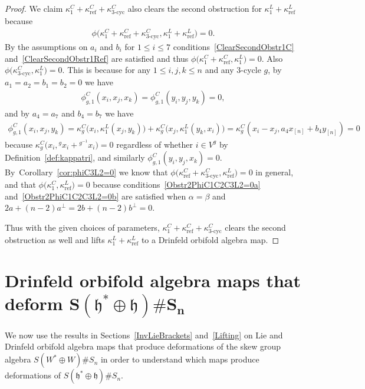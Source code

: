 \documentclass[10pt,a4paper]{amsart}
\numberwithin{equation}{section}
\newcommand{\actby}[1]{{}^{#1}}
\newcommand{\actbylessspace}[1]{{}^{#1}\!}
\DeclareMathOperator{\refl}{ref}
\DeclareMathOperator{\tri}{3-cyc}
\begin{document}
\begin{proof}
We claim $\kappa^C_1+\kappa^C_{\refl}+\kappa^C_{\tri}$ also clears the second obstruction
for $\kappa^L_1+\kappa^L_{\refl}$ because
\begin{gather*}
\phi\big(\kappa^C_1+\kappa^C_{\refl}+\kappa^C_{\tri},\kappa^L_1+\kappa^L_{\refl}\big)=0.
\end{gather*}
By the assumptions on $a_i$ and $b_i$ for $1\leq i \leq 7$
conditions~\eqref{ClearSecondObstr1C} and~\eqref{ClearSecondObstr1Ref} are satisfied and thus
$\phi\big(\kappa^C_1+\kappa^C_{\refl},\kappa^L_1\big)=0$.
Also $\phi\big(\kappa^C_{\tri},\kappa^L_1\big)=0$. This is because
for any $1\leq i,j,k \leq n$ and any $3$-cycle $g$,
by $a_1=a_2=b_1=b_2=0$ we have
\begin{gather*}
\phi^C_{g,1}(x_i,x_j,x_k)=\phi^C_{g,1}(y_i,y_j,y_k)=0,
\end{gather*}
and by $a_4=a_7$ and $b_4=b_7$ we have
\begin{align*}
\phi^C_{g,1}(x_i,x_j,y_k)
=\kappa^C_g\big(x_i,\kappa^L_1(x_j,y_k)\big)+\kappa^C_g\big(x_j,\kappa^L_1(y_k,x_i)\big)
=\kappa^C_g(x_i-x_j,a_4 x_{[n]} + b_4 y_{[n]}) =0
\end{align*}
because $\kappa^C_g\big(x_i,\actby{g}x_i+\actbylessspace{g^{-1}}x_i\big)=0$
regardless of whether $i \in V^g$ by Definition~\ref{def:kappatri},
and similarly $\phi^C_{g,1}(y_i,y_j,x_k)=0$. By~Corollary~\ref{cor:phiC3L2=0} we know that
$\phi\big(\kappa^C_{\refl}+\kappa^C_{\tri},\kappa^L_{\refl}\big)=0$ in general,
and that $\phi\big(\kappa^C_1,\kappa^L_{\refl}\big)=0$ because
conditions~\eqref{Obstr2PhiC1C2C3L2=0a} and~\eqref{Obstr2PhiC1C2C3L2=0b}
are satisfied when
$\alpha=\beta$ and $2a+(n-2)a^\perp=2b+(n-2)b^\perp=0$.

Thus with the given choices of parameters,
$\kappa^C_1+\kappa^C_{\refl}+\kappa^C_{\tri}$ clears the second obstruction
as well and lifts $\kappa^L_1+\kappa^L_{\refl}$ to a Drinfeld orbifold algebra map.
\end{proof}


\section[Drinfeld orbifold algebra maps that deform S(h* + h)S_n]
{Drinfeld orbifold algebra maps that deform $\boldsymbol{S(\mathfrak{h}^*\oplus\mathfrak{h})\# S_n}$}\label{DoubledStandardDefs}

We now use the results in Sections~\ref{InvLieBrackets} and~\ref{Lifting}
on Lie and Drinfeld orbifold algebra
maps that produce deformations of the skew group algebra $S(W^* \oplus W)\# S_n$
in order to understand which maps produce deformations of $S(\mathfrak{h}^*\oplus\mathfrak{h})\# S_n$.
\end{document}
